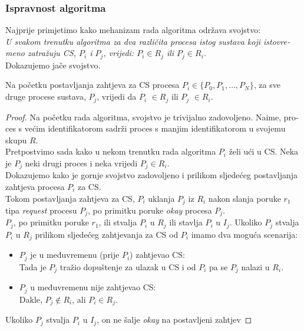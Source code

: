 \documentclass[12pt]{rectors}
\begin{document}
\begin{otherlanguage}{croatian}
 

\subsubsection{Ispravnost algoritma}
Najprije primjetimo kako mehanizam rada algoritma održava svojstvo:\\
\textit{U svakom trenutku algoritma za dva različita procesa istog sustava koji istovremeno zatražuju CS, $P_i$ i $P_j$, vrijedi: $P_i \in R_j$ ili $P_j \in R_i$.}
\vspace{0.5cm}
\\Dokazujemo jače svojstvo. 
\begin{description}
	\item
	Na početku postavljanja zahtjeva za CS procesa $P_i \in \{P_0,P_1, \hdots, P_N\}$,
	za sve druge procese sustava, $P_j$, vrijedi da $P_i$ $\in R_j$ ili $P_j$ $\in R_i$.
\end{description}
\begin{proof}
	Na početku rada algoritma, svojstvo je trivijalno zadovoljeno. Naime, proces s većim identifikatorom sadrži proces s manjim identifikatorom u svojemu skupu $R$.\\
	Pretpostvimo sada kako u nekom trenutku rada algoritma $P_i$ želi ući u CS.
	Neka je $P_j$ neki drugi proces i neka vrijedi $P_j \in R_i$.\\
	Dokazujemo kako je gornje svojstvo zadovoljeno i prilikom sljedećeg postavljanja zahtjeva procesa $P_i$ za CS.
	\vspace{0.2cm} 
	\\Tokom postavljanja zahtjeva za CS, $P_i$ uklanja $P_j$ iz $R_i$ nakon slanja poruke $r_1$ tipa \textit{request} procesu $P_j$, po primitku poruke \textit{okay} procesa $P_j$.
	\\$P_j$, po primitku poruke $r_1$, ili stvalja $P_i$ u $R_j$ ili stavlja $P_i$ u $I_j$.
	Ukoliko $P_j$ stvalja $P_i$ u $R_j$ prilikom sljedećeg zahtjevanja za CS od $P_i$ imamo dva moguća scenarija:%
	\begin{itemize}
		\item $P_j$ je u međuvremenu (prije $P_i$) zahtjevao CS:\\
		Tada je $P_j$ tražio dopuštenje za ulazak u CS i od $P_i$ pa se $P_j$ nalazi u 
		$R_i$.
		\item $P_j$ u međuvremenu nije zahtjevao CS:\\
		Dakle, $P_j \not \in R_i$, ali $P_i \in R_j$.
	\end{itemize}
	Ukoliko $P_j$ stvalja $P_i$ u $I_j$, on ne šalje \textit{okay} na postavljeni zahtjev 

\end{proof}
\end{otherlanguage}
\end{document}
